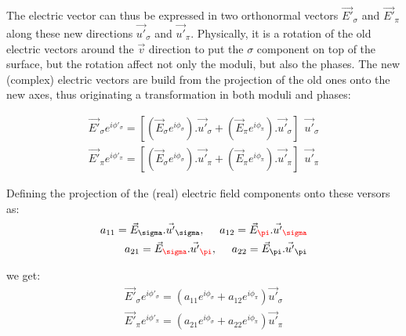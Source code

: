 \documentclass{iucr}
\newcommand{\inred}[1]{{\color{red}#1}}
\begin{document}






The electric vector can thus be expressed in two orthonormal vectors $\vec{E'}_\sigma$ and $\vec{E'}_\pi$ along these 
new directions $\vec{u'}_\sigma$ and $\vec{u'}_\pi$. Physically, it is a rotation of the old electric vectors around
the $\vec{v}$ direction to put the $\sigma$ component on top of the surface, but the rotation affect not only the 
moduli, but also the phases. The new (complex) electric vectors are build from the projection of the old ones onto the
new axes, thus originating a transformation in both moduli and phases:

\begin{eqnarray}
\vec{E'}_\sigma e^{i \phi'_\sigma} = [(\vec{E}_\sigma e^{i \phi_\sigma}).\vec{u'}_\sigma + (\vec{E}_\pi e^{i \phi_\pi}).\vec{u'}_\sigma ] 
  ~~\vec{u'}_\sigma  \\ 
\vec{E'}_\pi e^{i \phi'_\pi} = [(\vec{E}_\sigma e^{i \phi_\sigma}).\vec{u'}_\pi + (\vec{E}_\pi e^{i \phi_\pi}).\vec{u'}_\pi ] 
  ~~\vec{u'}_\pi 
\end{eqnarray}


Defining the projection of the (real) electric field components onto these versors as: 
\begin{eqnarray}
a_{11} = \vec{E}_\sigma . \vec{u'}_\sigma, ~~~~ 
a_{12} = \vec{E}_\inred{\pi} . \vec{u'}_\inred{\sigma} \nonumber \\
a_{21} = \vec{E}_\inred{\sigma} . \vec{u'}_\inred{\pi}, ~~~~
a_{22} = \vec{E}_\pi . \vec{u'}_\pi 
\end{eqnarray}

we get:
\begin{eqnarray}
\label{withphases}
\vec{E'}_\sigma e^{i \phi'_\sigma} = (a_{11} e^{i \phi_\sigma} + a_{12} e^{i \phi_\pi}) \vec{u'}_\sigma \nonumber \\ 
\vec{E'}_\pi e^{i \phi'_\pi} =    (a_{21} e^{i \phi_\sigma} + a_{22} e^{i \phi_\pi}) \vec{u'}_\pi
\end{eqnarray}
\end{document}
